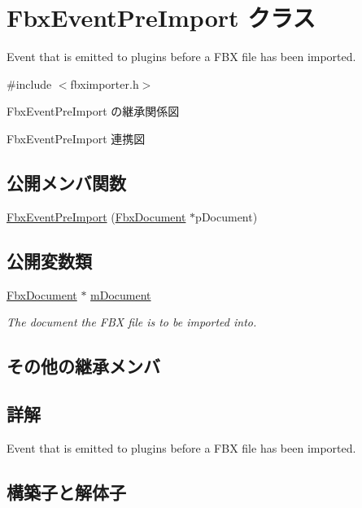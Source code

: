 \hypertarget{class_fbx_event_pre_import}{}\section{Fbx\+Event\+Pre\+Import クラス}
\label{class_fbx_event_pre_import}


Event that is emitted to plugins before a F\+BX file has been imported.  




{\ttfamily \#include $<$fbximporter.\+h$>$}



Fbx\+Event\+Pre\+Import の継承関係図


Fbx\+Event\+Pre\+Import 連携図
\subsection*{公開メンバ関数}
\begin{DoxyCompactItemize}
\item 
\hyperlink{class_fbx_event_pre_import_a67755900fb239a5c7d67b8e22d92eb60}{Fbx\+Event\+Pre\+Import} (\hyperlink{class_fbx_document}{Fbx\+Document} $\ast$p\+Document)
\end{DoxyCompactItemize}
\subsection*{公開変数類}
\begin{DoxyCompactItemize}
\item 
\hyperlink{class_fbx_document}{Fbx\+Document} $\ast$ \hyperlink{class_fbx_event_pre_import_a89b454dc61f00b64cc8a8f951e5e1003}{m\+Document}
\begin{DoxyCompactList}\small\item\em The document the F\+BX file is to be imported into. \end{DoxyCompactList}\end{DoxyCompactItemize}
\subsection*{その他の継承メンバ}


\subsection{詳解}
Event that is emitted to plugins before a F\+BX file has been imported. 

\subsection{構築子と解体子}
\mbox{\label{class_fbx_event_pre_import_a67755900fb239a5c7d67b8e22d92eb60}} 

